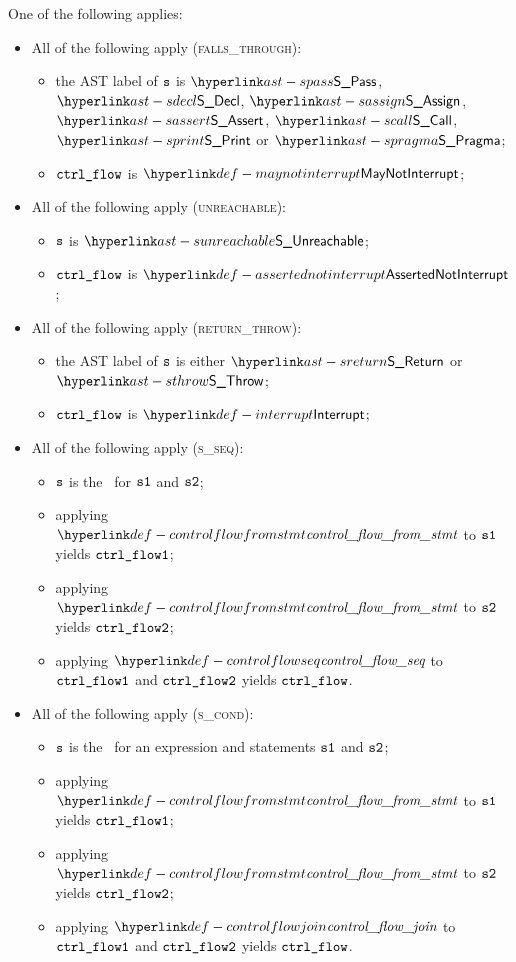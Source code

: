 \ProseParagraph
One of the following applies:
\begin{itemize}
  \item All of the following apply (\textsc{falls\_through}):
  \begin{itemize}
    \item the AST label of $\texttt{s}$ is $\SPass$, $\SDecl$, $\SAssign$, $\SAssert$, $\SCall$, $\SPrint$ or $\SPragma$;
    \item $\texttt{ctrl\_flow}$ is $\maynotinterrupt$;
  \end{itemize}

  \item All of the following apply (\textsc{unreachable}):
  \begin{itemize}
    \item $\texttt{s}$ is $\SUnreachable$;
    \item $\texttt{ctrl\_flow}$ is $\assertednotinterrupt$;
  \end{itemize}

  \item All of the following apply (\textsc{return\_throw}):
  \begin{itemize}
    \item the AST label of $\texttt{s}$ is either $\SReturn$ or $\SThrow$;
    \item $\texttt{ctrl\_flow}$ is $\interrupt$;
  \end{itemize}

  \item All of the following apply (\textsc{s\_seq}):
  \begin{itemize}
    \item $\texttt{s}$ is the \sequencingstatementterm\ for $\texttt{s1}$ and $\texttt{s2}$;
    \item applying $\controlflowfromstmt$ to $\texttt{s1}$ yields $\texttt{ctrl\_flow1}$;
    \item applying $\controlflowfromstmt$ to $\texttt{s2}$ yields $\texttt{ctrl\_flow2}$;
    \item applying $\controlflowseq$ to $\texttt{ctrl\_flow1}$ and $\texttt{ctrl\_flow2}$ yields $\texttt{ctrl\_flow}$.
  \end{itemize}

  \item All of the following apply (\textsc{s\_cond}):
  \begin{itemize}
    \item $\texttt{s}$ is the \conditionalstatementterm\ for an expression and statements $\texttt{s1}$ and $\texttt{s2}$;
    \item applying $\controlflowfromstmt$ to $\texttt{s1}$ yields $\texttt{ctrl\_flow1}$;
    \item applying $\controlflowfromstmt$ to $\texttt{s2}$ yields $\texttt{ctrl\_flow2}$;
    \item applying $\controlflowjoin$ to $\texttt{ctrl\_flow1}$ and $\texttt{ctrl\_flow2}$ yields $\texttt{ctrl\_flow}$.
  \end{itemize}


\end{itemize}
